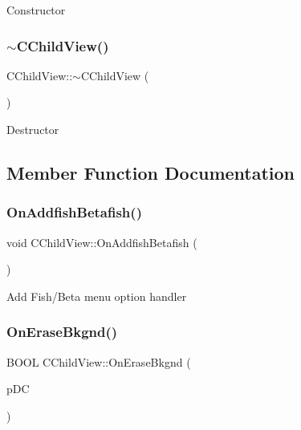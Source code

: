 Constructor \mbox{\label{class_c_child_view_a5b033b5e0a130950719a173b86418698}} 
\subsubsection{\texorpdfstring{$\sim$CChildView()}{~CChildView()}}
{\footnotesize\ttfamily C\+Child\+View\+::$\sim$\+C\+Child\+View (\begin{DoxyParamCaption}{ }\end{DoxyParamCaption})\hspace{0.3cm}{\ttfamily [virtual]}}

Destructor 

\subsection{Member Function Documentation}
\mbox{\label{class_c_child_view_ad05faefbdb17d1c73f85de75b01a1ac1}} 
\subsubsection{\texorpdfstring{OnAddfishBetafish()}{OnAddfishBetafish()}}
{\footnotesize\ttfamily void C\+Child\+View\+::\+On\+Addfish\+Betafish (\begin{DoxyParamCaption}{ }\end{DoxyParamCaption})}

Add Fish/\+Beta menu option handler \mbox{\label{class_c_child_view_a6060e6d09d522d345dcee5a01d41c1f0}} 
\subsubsection{\texorpdfstring{OnEraseBkgnd()}{OnEraseBkgnd()}}
{\footnotesize\ttfamily B\+O\+OL C\+Child\+View\+::\+On\+Erase\+Bkgnd (\begin{DoxyParamCaption}\item[{C\+DC $\ast$}]{p\+DC }\end{DoxyParamCaption})}

